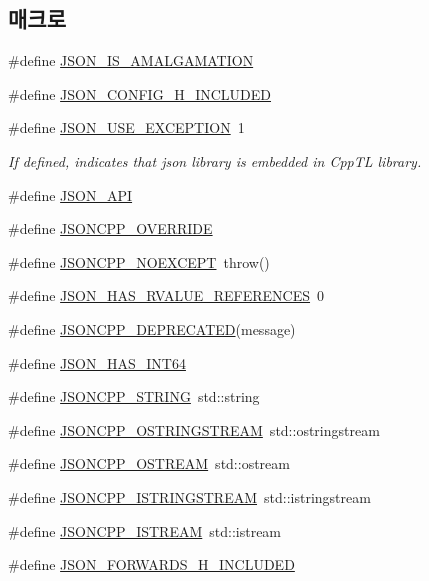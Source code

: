 \subsection*{매크로}
\begin{DoxyCompactItemize}
\item 
\#define \hyperlink{json-forwards_8h_a1bf16856b5e907aa83ed7bc825bc5ecf}{J\+S\+O\+N\+\_\+\+I\+S\+\_\+\+A\+M\+A\+L\+G\+A\+M\+A\+T\+I\+ON}
\item 
\#define \hyperlink{json-forwards_8h_a71f1a94bee4773f2a6e30eeac7deb963}{J\+S\+O\+N\+\_\+\+C\+O\+N\+F\+I\+G\+\_\+\+H\+\_\+\+I\+N\+C\+L\+U\+D\+ED}
\item 
\#define \hyperlink{json-forwards_8h_a51968e67b1462ac893f87a0fc8b791cd}{J\+S\+O\+N\+\_\+\+U\+S\+E\+\_\+\+E\+X\+C\+E\+P\+T\+I\+ON}~1
\begin{DoxyCompactList}\small\item\em If defined, indicates that json library is embedded in Cpp\+TL library. \end{DoxyCompactList}\item 
\#define \hyperlink{json-forwards_8h_a1d61ffde86ce1a18fd83194ff0d9a206}{J\+S\+O\+N\+\_\+\+A\+PI}
\item 
\#define \hyperlink{json-forwards_8h_a824d6199c91488107e443226fa6022c5}{J\+S\+O\+N\+C\+P\+P\+\_\+\+O\+V\+E\+R\+R\+I\+DE}
\item 
\#define \hyperlink{json-forwards_8h_af8418c6d82d9de6e5f3c739fcf2fe88d}{J\+S\+O\+N\+C\+P\+P\+\_\+\+N\+O\+E\+X\+C\+E\+PT}~throw()
\item 
\#define \hyperlink{json-forwards_8h_a978860f0e3983ca76a4e5af28d9bccd4}{J\+S\+O\+N\+\_\+\+H\+A\+S\+\_\+\+R\+V\+A\+L\+U\+E\+\_\+\+R\+E\+F\+E\+R\+E\+N\+C\+ES}~0
\item 
\#define \hyperlink{json-forwards_8h_a6933a4321aa03c8a29016669073f1af6}{J\+S\+O\+N\+C\+P\+P\+\_\+\+D\+E\+P\+R\+E\+C\+A\+T\+ED}(message)
\item 
\#define \hyperlink{json-forwards_8h_a210f7d060accd6a881cd070dc7a333a4}{J\+S\+O\+N\+\_\+\+H\+A\+S\+\_\+\+I\+N\+T64}
\item 
\#define \hyperlink{json-forwards_8h_a1e723f95759de062585bc4a8fd3fa4be}{J\+S\+O\+N\+C\+P\+P\+\_\+\+S\+T\+R\+I\+NG}~std\+::string
\item 
\#define \hyperlink{json-forwards_8h_a1d06ac2ca63c8c521f41231dfda0e6b3}{J\+S\+O\+N\+C\+P\+P\+\_\+\+O\+S\+T\+R\+I\+N\+G\+S\+T\+R\+E\+AM}~std\+::ostringstream
\item 
\#define \hyperlink{json-forwards_8h_a37a25be5fca174927780caeb280094ce}{J\+S\+O\+N\+C\+P\+P\+\_\+\+O\+S\+T\+R\+E\+AM}~std\+::ostream
\item 
\#define \hyperlink{json-forwards_8h_a1b5d70fe3d83273d200193177ded4c25}{J\+S\+O\+N\+C\+P\+P\+\_\+\+I\+S\+T\+R\+I\+N\+G\+S\+T\+R\+E\+AM}~std\+::istringstream
\item 
\#define \hyperlink{json-forwards_8h_a15f2f70b2ce0a2abd0f8112393dbc4de}{J\+S\+O\+N\+C\+P\+P\+\_\+\+I\+S\+T\+R\+E\+AM}~std\+::istream
\item 
\#define \hyperlink{json-forwards_8h_ac320ccec4dca293f3f50f35f7a595f3b}{J\+S\+O\+N\+\_\+\+F\+O\+R\+W\+A\+R\+D\+S\+\_\+\+H\+\_\+\+I\+N\+C\+L\+U\+D\+ED}
\end{DoxyCompactItemize}
